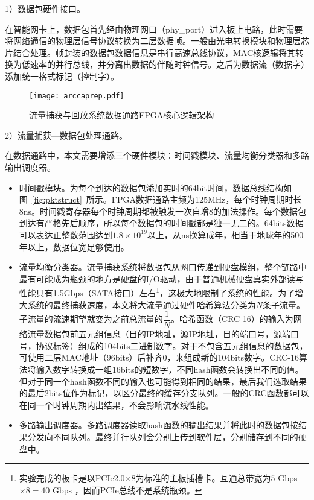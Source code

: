 1）数据包硬件接口。

在智能网卡上，数据包首先经由物理网口（phy\_port）进入板上电路，此时需要将网络通信的物理层信号协议转换为二层数据帧。一般由光电转换模块和物理层芯片结合处理。帧封装的数据包数据信息是串行高速总线协议，MAC核逻辑将其转换为低速率的并行总线，并分离出数据的伴随时钟信号。之后为数据流（数据字）添加统一格式标记（控制字）。

\begin{figure}[!ht]
	\centering 
	\vspace{-1.5mm}
	\texttt{[image: arccaprep.pdf]}
	\caption{流量捕获与回放系统数据通路FPGA核心逻辑架构} \label{fig:arccaprep}
\end{figure}

2）流量捕获---数据包处理通路。

在数据通路中，本文需要增添三个硬件模块：时间戳模块、流量均衡分类器和多路输出调度器。

\begin{itemize}
	\item 时间戳模块。为每个到达的数据包添加实时的64bit时间，数据总线结构如图~\ref{fig:pktstruct}~所示。FPGA数据通路主频为125MHz，每个时钟周期时长8ns。时间戳寄存器每个时钟周期都被触发一次自增8的加法操作。每个数据包到达有严格先后顺序，所以每个数据包的时间戳都是独一无二的。64bits数据可以表达正整数范围达到$1.8\times10^{19}$以上，从ns换算成年，相当于地球年的500年以上，数据位宽足够使用。
	\item 流量均衡分类器。流量捕获系统将数据包从网口传递到硬盘模组，整个链路中最有可能成为瓶颈的地方是硬盘的I/O驱动，由于普通机械硬盘真实外部读写性能只有1.5Gbps（SATA接口）左右\footnote{实验完成的板卡是以PCIe2.0$ \times $8为标准的主板插槽卡。互通总带宽为$ 5$ Gbps $\times 8=40$  Gbps ，因而PCIe总线不是系统瓶颈。}，这极大地限制了系统的性能。为了增大系统的最终捕获速度，本文将大流量通过硬件哈希算法分类为$N$条子流量。子流量的流速期望就变为之前总流量的$\dfrac{1}{N}$。哈希函数（CRC-16）的输入为网络流量数据包前五元组信息（目的IP地址，源IP地址，目的端口号，源端口号，协议标签）组成的104bits二进制数字。对于不包含五元组信息的数据包，可使用二层MAC地址（96bits）后补齐0，来组成新的104bits数字。CRC-16算法将输入数字转换成一组16bits的短数字，不同hash函数会转换出不同的值。但对于同一个hash函数不同的输入也可能得到相同的结果，最后我们选取结果的最后2bits位作为标记，以区分最终的缓存分支队列。一般的CRC函数都可以在同一个时钟周期内出结果，不会影响流水线性能。
	\item 多路输出调度器。多路调度器读取hash函数的输出结果并将此时的数据包按结果分发向不同队列。最终并行队列会分别上传到软件层，分别储存到不同的硬盘中。

\end{itemize}

